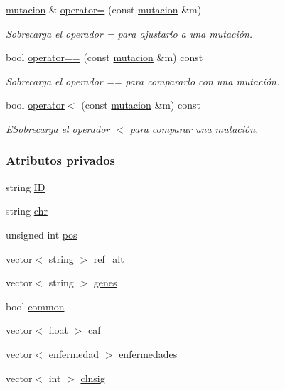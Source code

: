 \begin{DoxyCompactItemize}
\hyperlink{classmutacion}{mutacion} \& \hyperlink{classmutacion_aa38c36e397000cbef22a5933f56d59ed}{operator=} (const \hyperlink{classmutacion}{mutacion} \&m)
\begin{DoxyCompactList}\small\item\em Sobrecarga el operador = para ajustarlo a una mutación. \end{DoxyCompactList}\item 
bool \hyperlink{classmutacion_a2e36c20aeff8c7cc88abe84efe0b11be}{operator==} (const \hyperlink{classmutacion}{mutacion} \&m) const 
\begin{DoxyCompactList}\small\item\em Sobrecarga el operador == para compararlo con una mutación. \end{DoxyCompactList}\item 
bool \hyperlink{classmutacion_a0ccb4444b7afd120dc4557fd05f9ca27}{operator$<$} (const \hyperlink{classmutacion}{mutacion} \&m) const 
\begin{DoxyCompactList}\small\item\em E\-Sobrecarga el operador $<$ para comparar una mutación. \end{DoxyCompactList}\end{DoxyCompactItemize}
\subsubsection*{Atributos privados}
\begin{DoxyCompactItemize}
\item 
string \hyperlink{classmutacion_aafc39218473e0f21eb0c3dc05dd4f35e}{I\-D}
\item 
string \hyperlink{classmutacion_a57651966b952f782240ff9cff72c5d2f}{chr}
\item 
unsigned int \hyperlink{classmutacion_ae1487b8648d0eaad68de5e4e5a87f3ff}{pos}
\item 
vector$<$ string $>$ \hyperlink{classmutacion_abeb13e023fc9a34120106bccf58d5086}{ref\-\_\-alt}
\item 
vector$<$ string $>$ \hyperlink{classmutacion_a65fb9e2186d1c54d490289661b141aa1}{genes}
\item 
bool \hyperlink{classmutacion_a6dabfef6167d64030f095887b15f65dd}{common}
\item 
vector$<$ float $>$ \hyperlink{classmutacion_aeb2ac56009900d9319873d00ee80e090}{caf}
\item 
vector$<$ \hyperlink{classenfermedad}{enfermedad} $>$ \hyperlink{classmutacion_a0decaa0406675999e766f913e6347d79}{enfermedades}
\item 
vector$<$ int $>$ \hyperlink{classmutacion_adc0290c4a6db7f4c7341b0183c7ef534}{clnsig}
\end{DoxyCompactItemize}



